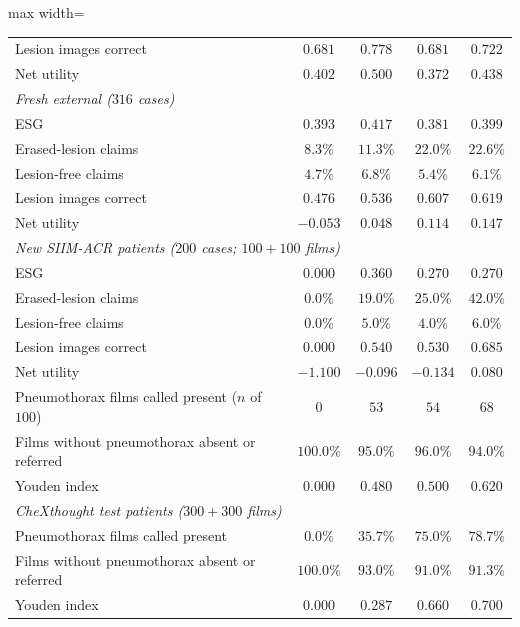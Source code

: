 \begin{table}[!htbp]
\begin{adjustbox}{max width=\linewidth}
\begin{tabular}{l cccc}
Lesion images correct & $0.681$ & $0.778$ & $0.681$ & $0.722$ \\
Net utility & $0.402$ & $0.500$ & $0.372$ & $0.438$ \\
\midrule
\multicolumn{5}{l}{\emph{Fresh external ($316$ cases)}} \\
ESG & $0.393$ & $0.417$ & $0.381$ & $0.399$ \\
Erased-lesion claims & $8.3\%$ & $11.3\%$ & $22.0\%$ & $22.6\%$ \\
Lesion-free claims & $4.7\%$ & $6.8\%$ & $5.4\%$ & $6.1\%$ \\
Lesion images correct & $0.476$ & $0.536$ & $0.607$ & $0.619$ \\
Net utility & $-0.053$ & $0.048$ & $0.114$ & $0.147$ \\
\midrule
\multicolumn{5}{l}{\emph{New SIIM-ACR patients ($200$ cases; $100 + 100$ films)}} \\
ESG & $0.000$ & $0.360$ & $0.270$ & $0.270$ \\
Erased-lesion claims & $0.0\%$ & $19.0\%$ & $25.0\%$ & $42.0\%$ \\
Lesion-free claims & $0.0\%$ & $5.0\%$ & $4.0\%$ & $6.0\%$ \\
Lesion images correct & $0.000$ & $0.540$ & $0.530$ & $0.685$ \\
Net utility & $-1.100$ & $-0.096$ & $-0.134$ & $0.080$ \\
Pneumothorax films called present ($n$ of $100$) & $0$ & $53$ & $54$ & $68$ \\
Films without pneumothorax absent or referred & $100.0\%$ & $95.0\%$ & $96.0\%$ & $94.0\%$ \\
Youden index & $0.000$ & $0.480$ & $0.500$ & $0.620$ \\
\midrule
\multicolumn{5}{l}{\emph{CheXthought test patients ($300 + 300$ films)}} \\
Pneumothorax films called present & $0.0\%$ & $35.7\%$ & $75.0\%$ & $78.7\%$ \\
Films without pneumothorax absent or referred & $100.0\%$ & $93.0\%$ & $91.0\%$ & $91.3\%$ \\
Youden index & $0.000$ & $0.287$ & $0.660$ & $0.700$ \\
\bottomrule
\end{tabular}
\end{adjustbox}
\end{table}

